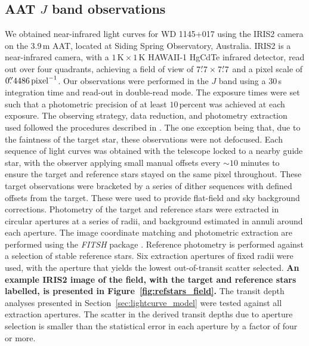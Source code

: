 \documentclass[useAMS,usenatbib]{mn2e}
\begin{document}
\subsection{AAT $J$ band observations}
\label{sec:obs_aat}

We obtained near-infrared light curves for WD 1145+017 using the IRIS2 camera \citep{2004SPIE.5492..998T} on the 3.9\,m AAT, located at Siding Spring Observatory, Australia. IRIS2 is a near-infrared camera, with a $1\,\mathrm{K} \times 1\,\mathrm{K}$ HAWAII-1 HgCdTe infrared detector, read out over four quadrants, achieving a field of view of $7\hbox{$.\mkern-4mu^\prime$}7 \times 7\hbox{$.\mkern-4mu^\prime$}7 $ and a pixel scale of $0\hbox{$.\!\!^{\prime\prime}$}4486\,\mathrm{pixel}^{-1}$. Our observations were performed in the $J$ band using a 30\,s integration time and read-out in double-read mode. The exposure times were set such that a photometric precision of at least $10\,\mathrm{per cent}$ was achieved at each exposure. The observing strategy, data reduction, and photometry extraction used followed the procedures described in \citet{2014MNRAS.445.2746Z,2015MNRAS.454.3002Z}. The one exception being that, due to the faintness of the target star, these observations were not defocused. Each sequence of light curves was obtained with the telescope locked to a nearby guide star, with the observer applying small manual offsets every $\sim 10$ minutes to ensure the target and reference stars stayed on the same pixel throughout. These target observations were bracketed by a series of dither sequences with defined offsets from the target. These were used to provide flat-field and sky background corrections. Photometry of the target and reference stars were extracted in circular apertures at a series of radii, and background estimated in annuli around each aperture. The image coordinate matching and photometric extraction are performed using the \emph{FITSH} package \citep{2012MNRAS.421.1825P}. Reference photometry is performed against a selection of stable reference stars. Six extraction apertures of fixed radii were used, with the aperture that yields the lowest out-of-transit scatter selected. \textbf{An example IRIS2 image of the field, with the target and reference stars labelled, is presented in Figure~\ref{fig:refstars_field}.} The transit depth analyses presented in Section~\ref{sec:lightcurve_model} were tested against all extraction apertures. The scatter in the derived transit depths due to aperture selection is smaller than the statistical error in each aperture by a factor of four or more. 
\end{document}
